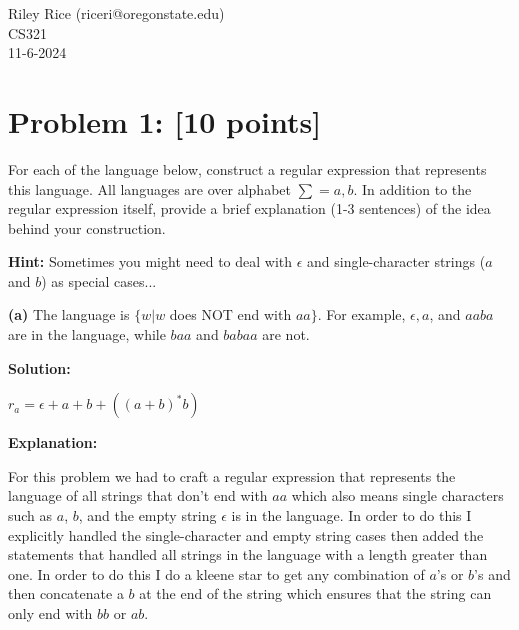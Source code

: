 \documentclass[11pt, letterpaper]{article}
\begin{document}
\noindent Riley Rice (riceri@oregonstate.edu)\\CS321\\11-6-2024

\begin{center}\end{center}

\section*{Problem 1: [10 points]}

\noindent For each of the language below, construct a regular expression that represents this language. All languages are over alphabet $\sum = {a,b}$. In addition to the regular expression itself, provide a brief explanation (1-3 sentences) of the idea behind your construction. 

\vspace{5mm}

\noindent\textbf{Hint:} Sometimes you might need to deal with $\epsilon$ and single-character strings ($a$ and $b$) as special cases...

\vspace{5mm}

\noindent \textbf{(a)} The language is $\{w | w$ does NOT end with $aa\}$. For example, $\epsilon, a$, and $aaba$ are in the language, while $baa$ and $babaa$ are not.

\vspace{5mm}

\noindent\textbf{Solution:}
 
\vspace {5mm}

\noindent $r_a = \epsilon + a + b + ((a + b)^*b)$ 

\vspace {5mm}

\noindent \textbf{Explanation:}

\vspace{5mm}

\noindent For this problem we had to craft a regular expression that represents the language of all strings that don't end with $aa$ which also means single characters such as $a$, $b$, and the empty string $\epsilon$ is in the language. In order to do this I explicitly handled the single-character and empty string cases then added the statements that handled all strings in the language with a length greater than one. In order to do this I do a kleene star to get any combination of $a$'s or $b$'s and then concatenate a $b$ at the end of the string which ensures that the string can only end with $bb$ or $ab$.
\end{document}
